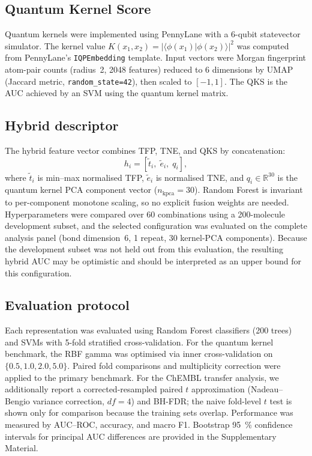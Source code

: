 \documentclass[11pt,a4paper]{article}
\begin{document}
\subsection{Quantum Kernel Score}

Quantum kernels were implemented using PennyLane \citep{pennylane_2024} with a 6-qubit statevector simulator. The kernel value $K(x_1, x_2) = |\langle \phi(x_1) | \phi(x_2) \rangle|^2$ was computed from PennyLane's \texttt{IQPEmbedding} template. Input vectors were Morgan fingerprint atom-pair counts (radius~2, \num{2048} features) reduced to 6 dimensions by UMAP (Jaccard metric, \texttt{random\_state=42}), then scaled to $[-1, 1]$. The QKS is the AUC achieved by an SVM using the quantum kernel matrix.

\subsection{Hybrid descriptor}

The hybrid feature vector combines TFP, TNE, and QKS by concatenation:
\begin{equation}
h_i = \left[\tilde{t}_i,\; \tilde{e}_i,\; q_i\right],
\end{equation}
where $\tilde{t}_i$ is min--max normalised TFP, $\tilde{e}_i$ is normalised TNE, and $q_i \in \mathbb{R}^{30}$ is the quantum kernel PCA component vector ($n_{\text{kpca}}=30$). Random Forest is invariant to per-component monotone scaling, so no explicit fusion weights are needed. Hyperparameters were compared over 60 combinations using a \num{200}-molecule development subset, and the selected configuration was evaluated on the complete analysis panel (bond dimension~6, \num{1} repeat, \num{30} kernel-PCA components). Because the development subset was not held out from this evaluation, the resulting hybrid AUC may be optimistic and should be interpreted as an upper bound for this configuration.

\subsection{Evaluation protocol}

Each representation was evaluated using Random Forest classifiers (\num{200} trees) and SVMs with 5-fold stratified cross-validation. For the quantum kernel benchmark, the RBF gamma was optimised via inner cross-validation on $\{0.5, 1.0, 2.0, 5.0\}$. Paired fold comparisons and multiplicity correction were applied to the primary benchmark. For the ChEMBL transfer analysis, we additionally report a corrected-resampled paired $t$ approximation (Nadeau--Bengio variance correction, $df = 4$) and BH-FDR; the naive fold-level $t$ test is shown only for comparison because the training sets overlap. Performance was measured by AUC--ROC, accuracy, and macro F1. Bootstrap \qty{95}{\percent} confidence intervals for principal AUC differences are provided in the Supplementary Material.
\end{document}
